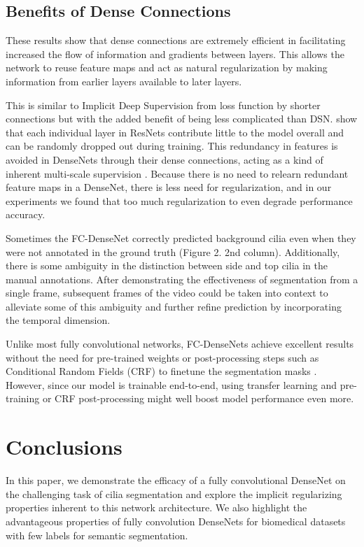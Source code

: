 \documentclass{llncs}
\begin{document}
\subsection{Benefits of Dense Connections}
These results show that dense connections are extremely efficient in facilitating increased the flow of information and gradients between layers. This allows the network to reuse feature maps and act as natural regularization by making information from earlier layers available to later layers. 
\par
This is similar to  Implicit Deep Supervision from loss function by shorter connections but with the added benefit of being less complicated than DSN. \cite{Stochastic} show that each individual layer in ResNets \cite{ResNet} contribute little to the model overall and can be randomly dropped out during training. This redundancy in features is avoided in DenseNets through their dense connections, acting as a kind of inherent multi-scale supervision \cite{DSN}. Because there is no need to relearn redundant feature maps in a DenseNet, there is less need for regularization, and in our experiments we found that too much regularization to even degrade performance accuracy. 
 \par
Sometimes the FC-DenseNet correctly predicted background cilia even when they were not annotated in the ground truth (Figure 2. 2nd column). Additionally, there is some ambiguity in the distinction between side and top cilia in the manual annotations. After demonstrating the effectiveness of segmentation from a single frame, subsequent frames of the video could be taken into context to alleviate some of this ambiguity and further refine prediction by incorporating the temporal dimension. 
 \par
Unlike most fully convolutional networks, FC-DenseNets achieve excellent results without the need for pre-trained weights or post-processing steps such as Conditional Random Fields (CRF) to finetune the segmentation masks  \cite{DeepLab,CRF}. However, since our model is trainable end-to-end, using transfer learning \cite{Transfer} and pre-training or CRF post-processing might well boost model performance even more.  


\section{Conclusions}
In this paper, we demonstrate the efficacy of a fully convolutional DenseNet on the challenging task of cilia segmentation and explore the implicit regularizing properties inherent to this network architecture. We also highlight the advantageous properties of fully convolution DenseNets for biomedical datasets with few labels for semantic segmentation.
\end{document}
